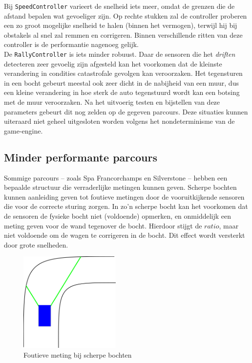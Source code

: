 \documentclass[10pt,a4paper]{article}
\begin{document}
			Bij \texttt{SpeedController} varieert de snelheid iets meer, omdat de grenzen die de afstand bepalen wat gevoeliger zijn. Op rechte stukken zal de controller proberen een zo groot mogelijke snelheid te halen (binnen het vermogen), terwijl hij bij obstakels al snel zal remmen en corrigeren. Binnen verschillende ritten van deze controller is de performantie nagenoeg gelijk.\\

			De \texttt{RallyController} is iets minder robuust. Daar de sensoren die het \textit{driften} detecteren zeer gevoelig zijn afgesteld kan het voorkomen dat de kleinste verandering in condities catastrofale gevolgen kan veroorzaken. Het tegensturen in een bocht gebeurt meestal ook zeer dicht in de nabijheid van een muur, dus een kleine verandering in hoe sterk de auto tegenstuurd wordt kan een botsing met de muur veroorzaken. Na het uitvoerig testen en bijstellen van deze parameters gebeurt dit nog zelden op de gegeven parcours. Deze situaties kunnen uiteraard niet geheel uitgesloten worden volgens het nondeterminisme van de game-engine.\\

		\subsection{Minder performante parcours}
			Sommige parcours -- zoals Spa Francorchamps en Silverstone -- hebben een bepaalde structuur die verraderlijke metingen kunnen geven. Scherpe bochten kunnen aanleiding geven tot foutieve metingen door de vooruitkijkende sensoren die voor de correcte sturing zorgen. In zo'n scherpe bocht kan het voorkomen dat de sensoren de fysieke bocht niet (voldoende) opmerken, en onmiddelijk een meting geven voor de wand tegenover de bocht. Hierdoor stijgt de $ratio$, maar niet voldoende om de wagen te corrigeren in de bocht. Dit effect wordt versterkt door grote snelheden.

			\begin{figure}[h]
				\centering
				\includegraphics[width=5cm]{sensors-corner.png}
				\caption{Foutieve meting bij scherpe bochten}
				\label{fig:sensors-corner}
			\end{figure}
\end{document}
